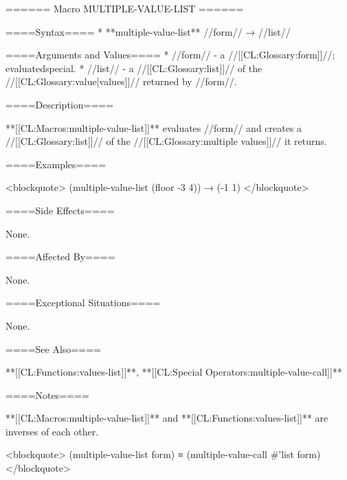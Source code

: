 ====== Macro MULTIPLE-VALUE-LIST ======

====Syntax====
  * **multiple-value-list** //form// → //list//

====Arguments and Values====
  * //form// - a //[[CL:Glossary:form]]//; evaluatedspecial.
  * //list// - a //[[CL:Glossary:list]]// of the //[[CL:Glossary:value|values]]// returned by //form//.

====Description====

**[[CL:Macros:multiple-value-list]]** evaluates //form// and creates a //[[CL:Glossary:list]]// of the //[[CL:Glossary:multiple values]]// it returns.

====Examples====

<blockquote> (multiple-value-list (floor -3 4)) → (-1 1) </blockquote>

====Side Effects====

None.

====Affected By====

None.

====Exceptional Situations====

None.

====See Also====

**[[CL:Functions:values-list]]**, **[[CL:Special Operators:multiple-value-call]]**

====Notes====

**[[CL:Macros:multiple-value-list]]** and **[[CL:Functions:values-list]]** are inverses of each other.

<blockquote> (multiple-value-list form) ≡ (multiple-value-call #'list form) </blockquote>


